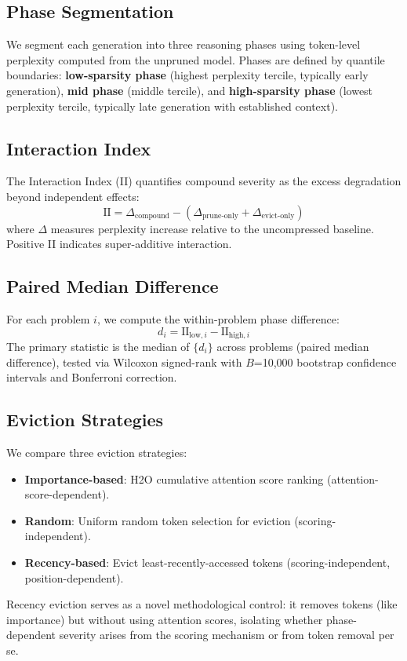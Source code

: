 \documentclass[11pt,a4paper]{article}
\begin{document}
\subsection{Phase Segmentation}

We segment each generation into three reasoning phases using token-level perplexity computed from the unpruned model. Phases are defined by quantile boundaries: \textbf{low-sparsity phase} (highest perplexity tercile, typically early generation), \textbf{mid phase} (middle tercile), and \textbf{high-sparsity phase} (lowest perplexity tercile, typically late generation with established context).

\subsection{Interaction Index}

The Interaction Index (II) quantifies compound severity as the excess degradation beyond independent effects:
\begin{equation}
\text{II} = \Delta_{\text{compound}} - (\Delta_{\text{prune-only}} + \Delta_{\text{evict-only}})
\end{equation}
where $\Delta$ measures perplexity increase relative to the uncompressed baseline. Positive II indicates super-additive interaction.

\subsection{Paired Median Difference}

For each problem $i$, we compute the within-problem phase difference:
\begin{equation}
d_i = \text{II}_{\text{low},i} - \text{II}_{\text{high},i}
\end{equation}
The primary statistic is the median of $\{d_i\}$ across problems (paired median difference), tested via Wilcoxon signed-rank with $B$=10,000 bootstrap confidence intervals and Bonferroni correction.

\subsection{Eviction Strategies}

We compare three eviction strategies:
\begin{itemize}
\item \textbf{Importance-based}: H2O cumulative attention score ranking (attention-score-dependent).
\item \textbf{Random}: Uniform random token selection for eviction (scoring-independent).
\item \textbf{Recency-based}: Evict least-recently-accessed tokens (scoring-independent, position-dependent).
\end{itemize}
Recency eviction serves as a novel methodological control: it removes tokens (like importance) but without using attention scores, isolating whether phase-dependent severity arises from the scoring mechanism or from token removal per se.
\end{document}
